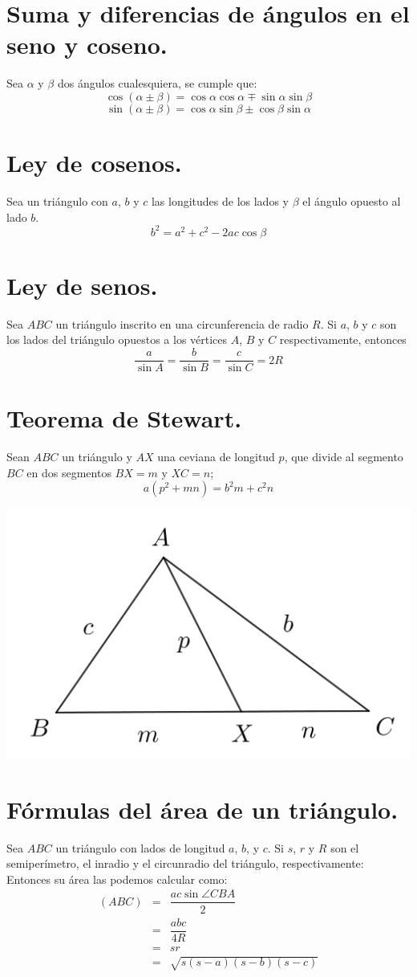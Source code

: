 \documentclass[12pt,a4paper]{book}
\begin{document}
\section{Suma y diferencias de ángulos en el seno y coseno.}
Sea $\alpha$ y $\beta$ dos ángulos cualesquiera, se cumple que:$$\cos ( \alpha \pm \beta) = \cos \alpha \cos \alpha \mp \sin \alpha \sin \beta$$
$$\sin (\alpha \pm \beta) = \cos \alpha \sin \beta \pm \cos \beta \sin \alpha$$
\section{Ley de cosenos.}
Sea un triángulo con $a$, $b$ y $c$ las longitudes de los lados y $\beta$ el ángulo opuesto al lado $b$.
$$b^2 = a^2 + c^2 -2ac \cos \beta$$
\section{Ley de senos.}
Sea $ABC$ un triángulo inscrito en una circunferencia de radio $R$. Si $a$, $b$ y $c$ son los lados del triángulo opuestos a los vértices $A$, $B$ y $C$ respectivamente, entonces$$ \dfrac{a}{\sin A} = \dfrac{b}{\sin B}= \dfrac{c}{\sin C}= 2R$$
\section{Teorema de Stewart.}
Sean $ABC$ un triángulo y $AX$ una ceviana de longitud $p$, que divide al segmento $BC$ en dos segmentos $BX=m$ y $XC=n$; $$a(p^2 +mn) = b^2m + c^2n$$
\begin{center}
\includegraphics[scale=0.6]{Imagenes/stewart.png} 
\end{center}
\section{Fórmulas del área de un triángulo.}
Sea $ABC$ un triángulo con lados de longitud $a$, $b$, y $c$. Si $s$, $r$ y $R$ son el semiperímetro, el inradio y el circunradio del triángulo, respectivamente: Entonces su área las podemos calcular como:
\begin{eqnarray*}
(ABC)&=& \dfrac{ac \sin \angle CBA}{2}
\\&=& \dfrac{abc}{4R}
\\&=& sr
\\&=& \sqrt{s(s-a)(s-b)(s-c)}
\end{eqnarray*}
\end{document}
